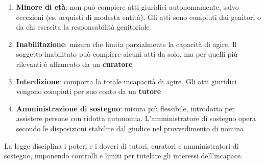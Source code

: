 \documentclass[10pt,oneside,a4paper]{article}
\begin{document}
	\begin{enumerate}
		\item \textbf{Minore di età}: non può compiere atti giuridici autonomamente, salvo eccezioni (es. acquisti di modesta entità). Gli atti sono compiuti dai genitori o da chi esercita la responsabilità genitoriale  
		\item \textbf{Inabilitazione}: misura che limita parzialmente la capacità di agire. Il soggetto inabilitato può compiere alcuni atti da solo, ma per quelli più rilevanti è affiancato da un \textbf{curatore}
		\item \textbf{Interdizione}: comporta la totale incapacità di agire. Gli atti giuridici vengono compiuti per suo conto da un \textbf{tutore} 
		\item \textbf{Amministrazione di sostegno}: misura più flessibile, introdotta per assistere persone con ridotta autonomia. L’amministratore di sostegno opera secondo le disposizioni stabilite dal giudice nel provvedimento di nomina
	\end{enumerate}
	La legge disciplina i poteri e i doveri di tutori, curatori e amministratori di sostegno, imponendo controlli e limiti per tutelare gli interessi dell’incapace.  
\end{document}
